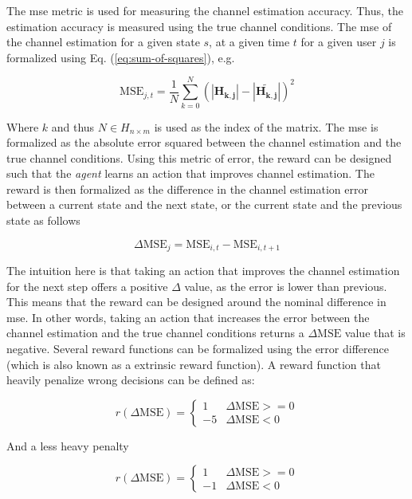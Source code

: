 The \gls{mse} metric is used for measuring the channel estimation accuracy. Thus, the estimation accuracy is measured using the true channel conditions. The \gls{mse} of the channel estimation for a given state $s$, at a given time $t$ for a given user $j$ is formalized using Eq. (\ref{eq:sum-of-squares}), e.g.

\begin{equation}\label{eq:mse_channel_estimation}
    \text{MSE}_{j,t} = \frac{1}{N} \sum_{k = 0}^{N} ( |\mathbf{H_{k,j}}| - |\mathbf{\widetilde{H_{k,j}}}| )^2
\end{equation}

Where $k$ and thus $N \in H_{n \times m}$ is used as the index of the matrix. The \gls{mse} is formalized as the absolute error squared between the channel estimation and the true channel conditions. Using this metric of error, the reward can be designed such that the \emph{agent} learns an action that improves channel estimation. The reward is then formalized as the difference in the channel estimation error between a current state and the next state, or the current state and the previous state as follows

\begin{equation}
    \Delta \text{MSE}_j = \text{MSE}_{i,t} - \text{MSE}_{i,t+1}
\end{equation}

The intuition here is that taking an action that improves the channel estimation for the next step offers a positive $\Delta$ value, as the error is lower than previous. This means that the reward can be designed around the nominal difference in \gls{mse}. In other words, taking an action that increases the error between the channel estimation and the true channel conditions returns a $\Delta \text{MSE}$ value that is negative. Several reward functions can be formalized using the error difference (which is also known as a extrinsic reward function). A reward function that heavily penalize wrong decisions can be defined as:

\begin{equation}\label{eq:reward_minus_5}
r(\Delta \text{MSE}) = \begin{cases}
1 &\Delta \text{MSE} >= 0\\
-5 &\Delta \text{MSE} < 0
\end{cases}
\end{equation}

\noindent And a less heavy penalty

\begin{equation}\label{eq:reward_minus_1}
r(\Delta \text{MSE}) = \begin{cases}
1 &\Delta \text{MSE} >= 0\\
-1 &\Delta \text{MSE} < 0
\end{cases}
\end{equation}

